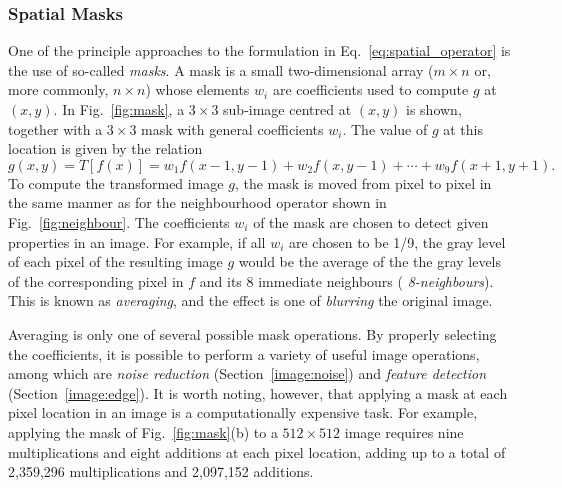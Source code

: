 
\subsubsection{Spatial Masks}
\label{pg:image:spatial:mask}

One of the principle approaches to the formulation in
Eq.~\ref{eq:spatial_operator} is the use of so-called {\em masks\/}.
A mask is a small two-dimensional array ($m\times n$ or, more
commonly, $n\times n$) whose elements $w_{i}$ are coefficients used to
compute $g$ at $(x,y)$.  In Fig.~\ref{fig:mask}, a $3\times 3$
sub-image centred at $(x,y)$ is shown, together with a $3\times 3$
mask with general coefficients $w_{i}$.  The value of $g$ at this
location is given by the relation
\begin{equation}
\label{eq:mask}
g(x,y)=T[f(x)]=w_{1}f(x-1,y-1)+w_{2}f(x,y-1)+\cdots+w_{9}f(x+1,y+1)\mbox{.}
\end{equation}
To compute the transformed image $g$, the mask is moved from pixel to
pixel in the same manner as for the neighbourhood operator shown in
Fig.~\ref{fig:neighbour}.  The coefficients $w_{i}$ of the mask are
chosen to detect given properties in an image.  For example, if all
$w_{i}$ are chosen to be 1/9, the gray level of each pixel of the
resulting image $g$ would be the average of the the gray levels of the
corresponding pixel in $f$ and its 8 immediate neighbours ({\em
  8-neighbours\/}).  This is known as {\em averaging\/}, and the
effect is one of {\em blurring\/} the original image.

Averaging is only one of several possible mask operations.  By
properly selecting the coefficients, it is possible to perform a
variety of useful image operations, among which are {\em noise
  reduction\/} (Section~\ref{image:noise}) and {\em feature
  detection\/} (Section~\ref{image:edge}).  It is worth noting,
however, that applying a mask at each pixel location in an image is a
computationally expensive task.  For example, applying the mask of
Fig.~\ref{fig:mask}(b) to a $512\times 512$ image requires nine
multiplications and eight additions at each pixel location, adding up
to a total of 2,359,296 multiplications and 2,097,152 additions.
